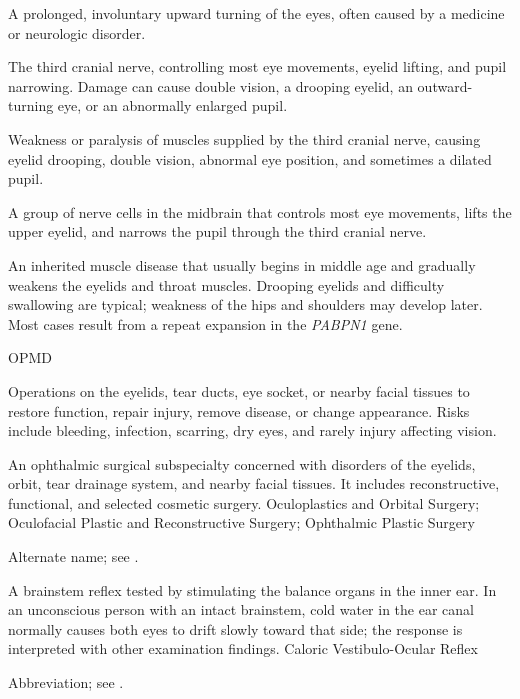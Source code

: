  A prolonged, involuntary upward turning of the eyes, often caused by a medicine or neurologic disorder.

 The third cranial nerve, controlling most eye movements, eyelid lifting, and pupil narrowing. Damage can cause double vision, a drooping eyelid, an outward-turning eye, or an abnormally enlarged pupil.

 Weakness or paralysis of muscles supplied by the third cranial nerve, causing eyelid drooping, double vision, abnormal eye position, and sometimes a dilated pupil.

 A group of nerve cells in the midbrain that controls most eye movements, lifts the upper eyelid, and narrows the pupil through the third cranial nerve.

 An inherited muscle disease that
usually begins in middle age and gradually weakens the eyelids and throat muscles.
Drooping eyelids and difficulty swallowing are typical; weakness of the hips and
shoulders may develop later. Most cases result from a repeat expansion in the
\textit{PABPN1} gene.

\synonyms
OPMD

 Operations on the eyelids, tear ducts, eye socket, or nearby facial tissues to restore function, repair injury, remove disease, or change appearance. Risks include bleeding, infection, scarring, dry eyes, and rarely injury affecting vision.

 An ophthalmic surgical subspecialty concerned with disorders of the eyelids, orbit, tear drainage system, and nearby facial tissues. It includes reconstructive, functional, and selected cosmetic surgery.
\synonyms
Oculoplastics and Orbital Surgery; Oculofacial Plastic and Reconstructive Surgery; Ophthalmic Plastic Surgery

 Alternate name; see .

 A brainstem reflex tested by stimulating the balance organs in the inner ear. In an unconscious person with an intact brainstem, cold water in the ear canal normally causes both eyes to drift slowly toward that side; the response is interpreted with other examination findings.
\synonyms
Caloric Vestibulo-Ocular Reflex

 Abbreviation; see .


